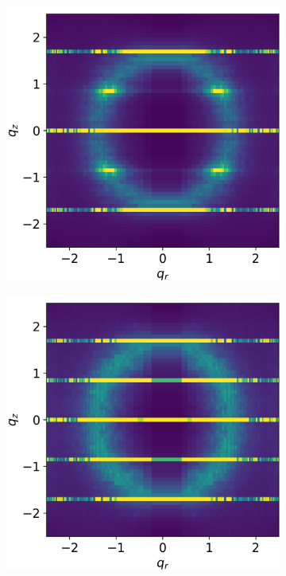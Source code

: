 \documentclass{article}
\begin{document}
  \begin{figure}
	\centering
	\begin{subfigure}{0.475\textwidth}
		\hspace{-1.2cm}
		\centering
		\includegraphics[width=\textwidth,valign=t]{rzlayeredrestrained.png}
		\caption{}\label{fig:rzplayeredrestrained}
	\end{subfigure}
	\begin{subfigure}{0.475\textwidth}
		\hspace{-1.2cm}
		\centering
		\includegraphics[width=\textwidth,valign=t]{rzoffsetrestrained.png}

\end{subfigure}
\end{figure}
\end{document}
